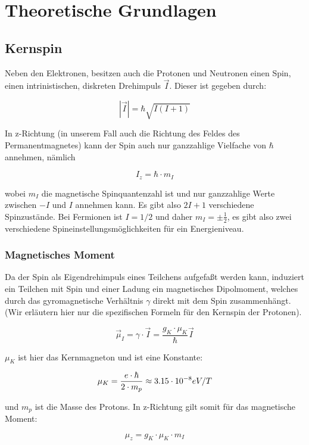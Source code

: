 \section{Theoretische Grundlagen}

\subsection{Kernspin}

Neben den Elektronen, besitzen auch die Protonen und Neutronen einen Spin, einen intrinistischen, diskreten Drehimpuls $\vec I$. Dieser ist gegeben durch:

$$ |\vec I| = \hbar \sqrt{I(I+1)} $$

In z-Richtung (in unserem Fall auch die Richtung des Feldes des Permanentmagnetes) kann der Spin auch nur ganzzahlige Vielfache von $\hbar$ annehmen, nämlich

$$I_z = \hbar\cdot m_I$$

wobei $m_I$ die magnetische Spinquantenzahl ist und nur ganzzahlige Werte zwischen $-I$ und $I$ annehmen kann. Es gibt also $2I+1$ verschiedene Spinzustände. Bei Fermionen ist $I=1/2$ und daher $m_I = \pm\frac{1}{2}$, es gibt also zwei verschiedene Spineinstellungsmöglichkeiten für ein Energieniveau.

\subsubsection{Magnetisches Moment}

Da der Spin als Eigendrehimpuls eines Teilchens aufgefaßt werden kann, induziert ein Teilchen mit Spin und einer Ladung ein magnetisches Dipolmoment, welches durch das gyromagnetische Verhältnis $\gamma$ direkt mit dem Spin zusammenhängt. (Wir erläutern hier nur die spezifischen Formeln für den Kernspin der Protonen).

\begin{equation} \vec \mu_I = \gamma\cdot\vec I = \frac{g_K\cdot\mu_K}{\hbar}\vec I \label{gyro}\end{equation}

$\mu_K$ ist hier das Kernmagneton und ist eine Konstante:

$$\mu_K = \frac{e\cdot \hbar}{2\cdot m_p} \approx 3.15\cdot 10^{-8} eV/T$$

und $m_p$ ist die Masse des Protons. In z-Richtung gilt somit für das magnetische Moment:

\begin{equation} \mu_z = g_K \cdot \mu_K \cdot m_I \label{muz} \end{equation}

